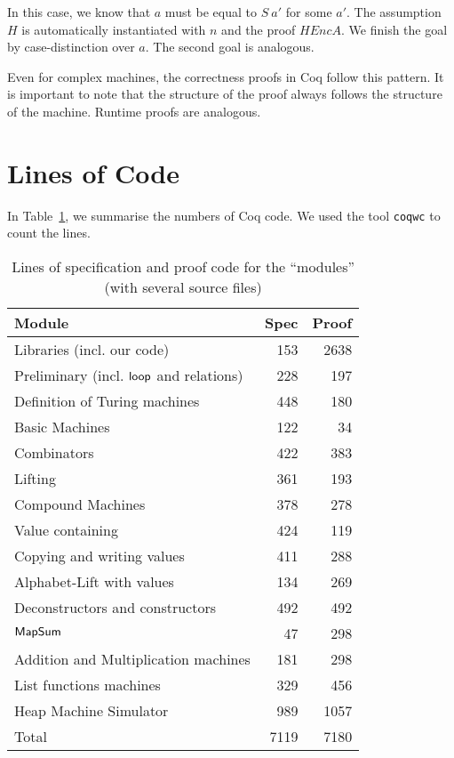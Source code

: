 In this case, we know that $a$ must be equal to $S~a'$ for some $a'$.  The assumption $H$ is automatically instantiated with $n$ and the proof
$HEncA$.  We finish the goal by case-distinction over $a$.  The second goal is analogous.


Even for complex machines, the correctness proofs in Coq follow this pattern.  It is important to note that the structure of the proof always follows
the structure of the machine.  Runtime proofs are analogous.


\section{Lines of Code}
\label{sec:coq-lines}

In Table~\ref{tab:coq-lines}, we summarise the numbers of Coq code.  We used the tool \texttt{coqwc} to count the lines.%
\begin{table}[h]
  \centering
  \begin{tabular}{p{7cm}|r|r}
    Module                                    & Spec & Proof\\ \hline
    Libraries (incl. our code)                &  153 & 2638 \\
    Preliminary (incl. $\mathsf{loop}$ and relations) &  228 &  197 \\
    Definition of Turing machines             &  448 &  180 \\
    Basic Machines                            &  122 &   34 \\
    Combinators                               &  422 &  383 \\
    Lifting                                   &  361 &  193 \\
    Compound Machines                         &  378 &  278 \\
    Value containing                          &  424 &  119 \\
    Copying and writing values                &  411 &  288 \\
    Alphabet-Lift with values                 &  134 &  269 \\
    Deconstructors and constructors           &  492 &  492 \\
    $\mathsf{MapSum}$                             &   47 &  298 \\
    Addition and Multiplication machines      &  181 &  298 \\
    List functions machines                   &  329 &  456 \\
    Heap Machine Simulator                    &  989 & 1057 \\ \hline\hline
    Total                                     & 7119 & 7180 \\
  \end{tabular}
  \caption{Lines of specification and proof code for the ``modules'' (with several source files)}
  \label{tab:coq-lines}
\end{table}



